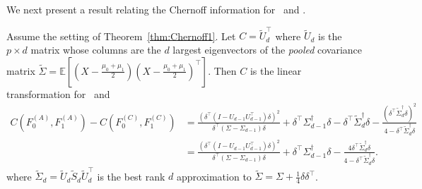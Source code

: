 \documentclass[11pt]{extarticle}
\begin{document}
We next present a result relating the Chernoff information for \Lol~and \Lda.
\begin{thm}
\label{thm:Chernoff2}
Assume the setting of Theorem~\ref{thm:Chernoff1}.
Let $C = \tilde{U}_d^{\top}$ where $\tilde{U}_d$ is the $p \times d$ matrix whose columns are the $d$ largest eigenvectors of the {\em pooled} covariance matrix $\tilde{\Sigma} = \mathbb{E}[(X - \tfrac{\mu_0 + \mu_1}{2})(X - \tfrac{\mu_0 + \mu_1}{2})^{\top}]$.
Then $C$ is the linear transformation for \Pca~and
\begin{equation}
\begin{split}
C(F_0^{(A)}, F_1^{(A)}) - C(F_0^{(C)}, F_1^{(C)})
&=
\frac{(\delta^{\top} (I - U_{d-1} U_{d-1}^{\top}) \delta)^{2} } {\delta^{\top} (\Sigma - \Sigma _{d-1})\delta} + \delta^{\top} \Sigma_{d-1}^{\dagger} \delta -
\delta^{\top} \tilde{\Sigma}_d^{\dagger} \delta - \frac{(\delta^{\top} \tilde{\Sigma}_d^{\dagger} \delta)^2}{4 - \delta^{\top} \tilde{\Sigma}_d^{\dagger} \delta}
\\ &=
\frac{(\delta^{\top} (I - U_{d-1} U_{d-1}^{\top}) \delta)^{2} } {\delta^{\top} (\Sigma - \Sigma _{d-1})\delta} + \delta^{\top} \Sigma_{d-1}^{\dagger} \delta -
\frac{4 \delta^{\top} \tilde{\Sigma}_d^{\dagger} \delta}{4 - \delta^{\top} \tilde{\Sigma}_d^{\dagger} \delta}.
\end{split}
\end{equation}
where $\tilde{\Sigma}_d = \tilde{U}_d \tilde{S}_d \tilde{U}_d^{\top}$ is the best rank $d$ approximation to $\tilde{\Sigma} = \Sigma + \tfrac{1}{4} \delta \delta^{\top}$.
\end{thm}
\end{document}
